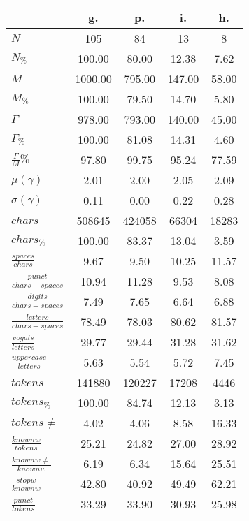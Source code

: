 \begin{table}[h!]
\begin{center}
\begin{tabular}{| l || c | c | c | c |}\hline
 & {\bf g.} & {\bf p.} & {\bf i.} & {\bf h.} \\\hline\hline
$N$ & 105  & 84  & 13  & 8 \\
$N_{\%}$ & 100.00  & 80.00  & 12.38  & 7.62 \\\hline
$M$ & 1000.00  & 795.00  & 147.00  & 58.00 \\
$M_{\%}$ & 100.00  & 79.50  & 14.70  & 5.80 \\\hline
$\Gamma$ & 978.00  & 793.00  & 140.00  & 45.00 \\
$\Gamma_{\%}$ & 100.00  & 81.08  & 14.31  & 4.60 \\\hline
$\frac{\Gamma}{M}\%$ & 97.80  & 99.75  & 95.24  & 77.59 \\
$\mu(\gamma)$ & 2.01  & 2.00  & 2.05  & 2.09 \\
$\sigma(\gamma)$ & 0.11  & 0.00  & 0.22  & 0.28 \\\hline\hline
$chars$ & 508645  & 424058  & 66304  & 18283 \\
$chars_{\%}$ & 100.00  & 83.37  & 13.04  & 3.59 \\\hline
$\frac{spaces}{chars}$ & 9.67  & 9.50  & 10.25  & 11.57 \\
$\frac{punct}{chars-spaces}$ & 10.94  & 11.28  & 9.53  & 8.08 \\
$\frac{digits}{chars-spaces}$ & 7.49  & 7.65  & 6.64  & 6.88 \\\hline
$\frac{letters}{chars-spaces}$ & 78.49  & 78.03  & 80.62  & 81.57 \\
$\frac{vogals}{letters}$ & 29.77  & 29.44  & 31.28  & 31.62 \\
$\frac{uppercase}{letters}$ & 5.63  & 5.54  & 5.72  & 7.45 \\\hline\hline
$tokens$ & 141880  & 120227  & 17208  & 4446 \\
$tokens_{\%}$ & 100.00  & 84.74  & 12.13  & 3.13 \\
$tokens \neq$ & 4.02  & 4.06  & 8.58  & 16.33 \\\hline
$\frac{knownw}{tokens}$ & 25.21  & 24.82  & 27.00  & 28.92 \\
$\frac{knownw \neq}{knownw}$ & 6.19  & 6.34  & 15.64  & 25.51 \\\hline
$\frac{stopw}{knownw}$ & 42.80  & 40.92  & 49.49  & 62.21 \\
$\frac{punct}{tokens}$ & 33.29  & 33.90  & 30.93  & 25.98 \\

\end{tabular}
\end{center}
\end{table}
